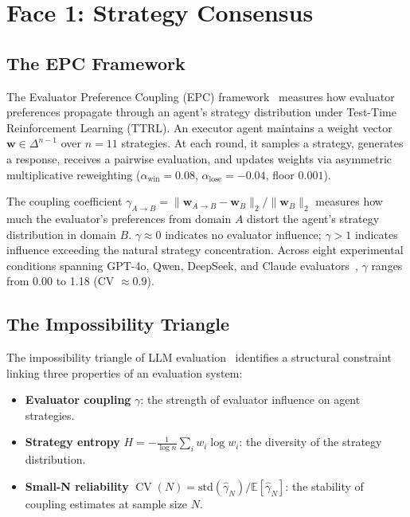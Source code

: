 \documentclass[11pt]{article}
\DeclareMathOperator{\CV}{CV}
\begin{document}
\section{Face 1: Strategy Consensus}

\subsection{The EPC Framework}

The Evaluator Preference Coupling (EPC) framework~\cite{liu2026mmepc} measures how evaluator preferences propagate through an agent's strategy distribution under Test-Time Reinforcement Learning (TTRL). An executor agent maintains a weight vector $\mathbf{w} \in \Delta^{n-1}$ over $n = 11$ strategies. At each round, it samples a strategy, generates a response, receives a pairwise evaluation, and updates weights via asymmetric multiplicative reweighting ($\alpha_{\text{win}} = 0.08$, $\alpha_{\text{lose}} = -0.04$, floor $0.001$).

The coupling coefficient $\gamma_{A \to B} = \|\mathbf{w}_{A \to B} - \mathbf{w}_B\|_2 / \|\mathbf{w}_B\|_2$ measures how much the evaluator's preferences from domain $A$ distort the agent's strategy distribution in domain $B$. $\gamma \approx 0$ indicates no evaluator influence; $\gamma > 1$ indicates influence exceeding the natural strategy concentration. Across eight experimental conditions spanning GPT-4o, Qwen, DeepSeek, and Claude evaluators~\cite{liu2026mmepc}, $\gamma$ ranges from 0.00 to 1.18 (CV $\approx 0.9$).

\subsection{The Impossibility Triangle}

The impossibility triangle of LLM evaluation~\cite{liu2026impossible} identifies a structural constraint linking three properties of an evaluation system:
\begin{itemize}[leftmargin=*,nosep]
 \item \textbf{Evaluator coupling} $\gamma$: the strength of evaluator influence on agent strategies.
 \item \textbf{Strategy entropy} $H = -\frac{1}{\log n}\sum_i w_i \log w_i$: the diversity of the strategy distribution.
 \item \textbf{Small-N reliability} $\CV(N) = \text{std}(\hat{\gamma}_N) / \mathbb{E}[\hat{\gamma}_N]$: the stability of coupling estimates at sample size $N$.
\end{itemize}
\end{document}
